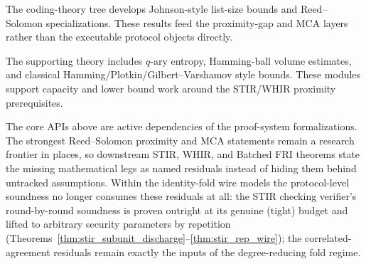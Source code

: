 \begin{theorem}\label{thm:rs_johnson_list_size}
    The coding-theory tree develops Johnson-style list-size bounds and Reed--Solomon
    specializations. These results feed the proximity-gap and MCA layers rather than the
    executable protocol objects directly.
\end{theorem}

\begin{theorem}\label{thm:entropy_volume_bounds}
    The supporting theory includes $q$-ary entropy, Hamming-ball volume estimates, and classical
    Hamming/Plotkin/Gilbert--Varshamov style bounds. These modules support capacity and lower
    bound work around the STIR/WHIR proximity prerequisites.
\end{theorem}

\begin{remark}\label{rem:coding_status}
    The core APIs above are active dependencies of the proof-system formalizations. The strongest
    Reed--Solomon proximity and MCA statements remain a research frontier in places, so downstream
    STIR, WHIR, and Batched FRI theorems state the missing mathematical legs as named residuals
    instead of hiding them behind untracked assumptions.  Within the identity-fold wire models the
    protocol-level soundness no longer consumes these residuals at all: the STIR checking
    verifier's round-by-round soundness is proven outright at its genuine (tight) budget and
    lifted to arbitrary security parameters by repetition
    (Theorems~\ref{thm:stir_subunit_discharge}--\ref{thm:stir_rep_wire}); the correlated-agreement
    residuals remain exactly the inputs of the degree-reducing fold regime.
\end{remark}
